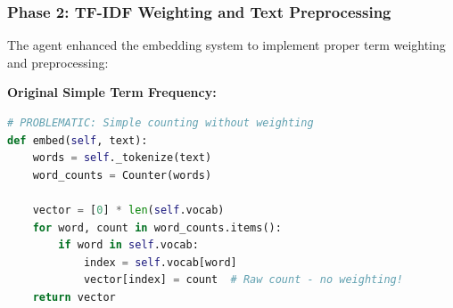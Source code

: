 \documentclass[12pt, a4paper]{article}
\begin{document}
\subsubsection{Phase 2: TF-IDF Weighting and Text Preprocessing}

The agent enhanced the embedding system to implement proper term weighting and preprocessing:

\textbf{Original Simple Term Frequency:}
\begin{lstlisting}[language=Python, caption=Original Naive Term Frequency Counting]
# PROBLEMATIC: Simple counting without weighting
def embed(self, text):
    words = self._tokenize(text)
    word_counts = Counter(words)
    
    vector = [0] * len(self.vocab)
    for word, count in word_counts.items():
        if word in self.vocab:
            index = self.vocab[word]
            vector[index] = count  # Raw count - no weighting!
    return vector
\end{lstlisting}
\end{document}
